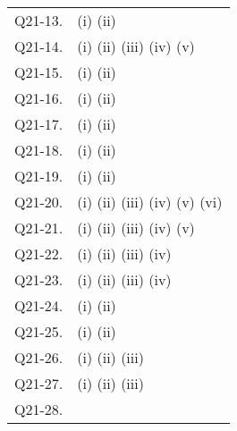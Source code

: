 \documentclass[uplatex,dvipdfmx,a4paper,11pt]{jlreq}
\numberwithin{equation}{section}
\theoremstyle{definition}
\begin{document}
\begin{table}[hbtp]
\begin{tabular}{ll}
    Q21-13. & (i) \quad (ii) \quad                                                                                           \\
    Q21-14. & (i) \quad (ii) \quad (iii) \quad (iv) \quad (v) \quad                                                          \\
    Q21-15. & (i) \quad (ii) \quad                                                                                           \\
    Q21-16. & (i) \quad (ii) \quad                                                                                           \\
    Q21-17. & (i) \quad (ii) \quad                                                                                           \\
    Q21-18. & (i) \quad (ii) \quad                                                                                           \\
    Q21-19. & (i) \quad (ii) \quad                                                                                           \\
    Q21-20. & (i) \quad (ii) \quad (iii) \quad (iv) \quad (v) \quad (vi) \quad                                               \\
    Q21-21. & (i) \quad (ii) \quad (iii) \quad (iv) \quad (v) \quad                                                          \\
    Q21-22. & (i) \quad (ii) \quad (iii) \quad (iv) \quad                                                                    \\
    Q21-23. & (i) \quad (ii) \quad (iii) \quad (iv) \quad                                                                    \\
    Q21-24. & (i) \quad (ii) \quad                                                                                           \\
    Q21-25. & (i) \quad (ii) \quad                                                                                           \\
    Q21-26. & (i) \quad (ii) \quad (iii) \quad                                                                               \\
    Q21-27. & (i) \quad (ii) \quad (iii) \quad                                                                               \\
    Q21-28. & \quad                                                                                                          \\

\end{tabular}
\end{table}
\end{document}
